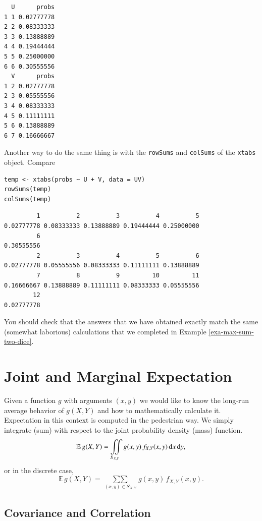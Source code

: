 \documentclass[captions=tableheading]{scrbook}
\begin{document}
\begin{verbatim}
  U      probs
1 1 0.02777778
2 2 0.08333333
3 3 0.13888889
4 4 0.19444444
5 5 0.25000000
6 6 0.30555556
  V      probs
1 2 0.02777778
2 3 0.05555556
3 4 0.08333333
4 5 0.11111111
5 6 0.13888889
6 7 0.16666667
\end{verbatim}

Another way to do the same thing is with the \texttt{rowSums} and \texttt{colSums} of the \texttt{xtabs} object. Compare


\lstset{language=R}
\begin{lstlisting}
temp <- xtabs(probs ~ U + V, data = UV)
rowSums(temp)
colSums(temp)
\end{lstlisting}


\begin{verbatim}
         1          2          3          4          5 
0.02777778 0.08333333 0.13888889 0.19444444 0.25000000 
         6 
0.30555556
         2          3          4          5          6 
0.02777778 0.05555556 0.08333333 0.11111111 0.13888889 
         7          8          9         10         11 
0.16666667 0.13888889 0.11111111 0.08333333 0.05555556 
        12 
0.02777778
\end{verbatim}

You should check that the answers that we have obtained exactly match the same (somewhat laborious) calculations that we completed in Example \ref{exa-max-sum-two-dice}.
\section{Joint and Marginal Expectation}
\label{sec-7-2}
\label{sec-Joint-and-Marginal-Expectation}


Given a function \(g\) with arguments \((x,y)\) we would like to know the long-run average behavior of \(g(X,Y)\) and how to mathematically calculate it. Expectation in this context is computed in the pedestrian way. We simply integrate (sum) with respect to the joint probability density (mass) function.
\begin{equation}
\mathbb{E}\, g(X,Y)=\iintop_{S_{X,Y}}g(x,y)\, f_{X,Y}(x,y)\,\mathrm{d} x\,\mathrm{d} y,
\end{equation}
or in the discrete case,
\begin{equation}
\mathbb{E}\, g(X,Y)=\mathop{\sum\sum}\limits _{(x,y)\in S_{X,Y}}g(x,y)\, f_{X,Y}(x,y).
\end{equation}
\subsection{Covariance and Correlation}
\label{sec-7-2-1}
\end{document}
